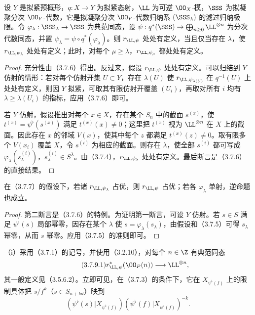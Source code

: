 设 $Y$ 是拟紧预概形，$q:X\to Y$ 为拟紧态射，$\LL$ 为可逆 $\OO_X$-模，$\SSS$ 为拟凝聚分次 $\OO_Y$-代数，它是拟凝聚分次 $\OO_Y$-代数归纳系 $(\SSS_\lambda)$ 的滤过归纳极限。令 $\varphi_\lambda:\SSS_\lambda\to\SSS$ 为典范同态，设
$\psi:q^*(\SSS)\to\bigoplus_{n\geq0}\LL^{\otimes n}$ 为分次代数同态，并置 $\psi_\lambda=\psi\circ q^*(\varphi_\lambda)$。则 $r_{\LL,\psi}$ 处处有定义，当且仅当存在 $\lambda$，使 $r_{\LL,\psi_\lambda}$ 处处有定义；此时，对每个 $\mu\geq\lambda$，$r_{\LL,\psi_\mu}$ 都处处有定义。
\begin{proof}
充分性由（3.7.6）得出。反过来，假设 $r_{\LL,\psi}$ 处处有定义。可以归结到 $Y$ 仿射的情形：若对每个仿射开集 $U\subset Y$，存在 $\lambda(U)$ 使 $r_{\LL,\psi_{\lambda(U)}}$ 在 $q^{-1}(U)$ 上处处有定义，则因 $Y$ 拟紧，可取其有限仿射开覆盖 $(U_i)$，再取对所有 $i$ 均有 $\lambda\geq\lambda(U_i)$ 的指标，应用（3.7.6）即可。

若 $Y$ 仿射，假设推出对每个 $x\in X$，存在某个 $S_n$ 中的截面 $s^{(x)}$，使 $t^{(x)}=\psi^\flat(s^{(x)})$ 满足 $t^{(x)}(x)\ne0$；这里把 $t^{(x)}$ 视为 $\LL^{\otimes n}$ 在 $X$ 上的截面。因此存在 $x$ 的邻域 $V(x)$，使其中每个 $z$ 都满足 $t^{(x)}(z)\ne0$。取有限多个 $V(x_i)$ 覆盖 $X$，令 $s^{(i)}$ 为相应的截面。则存在 $\lambda$，使全部 $s^{(i)}$ 都可写成 $\varphi_\lambda(s_\lambda^{(i)})$，$s_\lambda^{(i)}\in S^\lambda$。由（3.7.4），$r_{\LL,\psi_\lambda}$ 处处有定义。最后断言是（3.7.6）的直接结果。
\end{proof}

在（3.7.7）的假设下，若诸 $r_{\LL,\psi_\lambda}$ 占优，则 $r_{\LL,\psi}$ 占优；若各 $\varphi_\lambda$ 单射，逆命题也成立。
\begin{proof}
第二断言是（3.7.6）的特例。为证明第一断言，可设 $Y$ 仿射。若 $s\in S$ 满足 $\psi^\flat(s)$ 局部幂零，因存在某个 $\lambda$ 使 $s=\varphi_\lambda(s_\lambda)$，由假设和（3.7.5）可得 $s_\lambda$ 幂零，从而 $s$ 幂零。应用（3.7.5）的准则即可。
\end{proof}

（i）采用（3.7.1）的记号，并使用（3.2.10），对每个 $n\in\Z$ 有典范同态
\begin{equation}\tag{3.7.9.1}r_{\LL,\psi}^*(\OO_P(n))\longrightarrow\LL^{\otimes n},\end{equation}
其一般定义见（3.5.6.2）。立即可见，在（3.7.3）的条件下，它在 $X_{\psi^\flat(f)}$ 上的限制具体把
$s/f^k$（$s\in S_{n+kd}$）映到
\[
(\psi^\flat(s)|X_{\psi^\flat(f)})(\psi^\flat(f)|X_{\psi^\flat(f)})^{-k}.
\]

